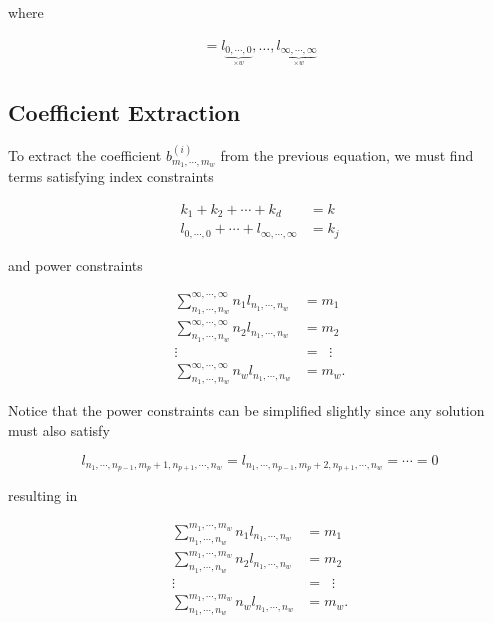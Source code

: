 where

\begin{align*}
    [l] = l_{\underbrace{0, \cdots, 0}_{\times w}}, \ldots, l_{\underbrace{\infty, \cdots, \infty}_{\times w}}
\end{align*}

\subsection{Coefficient Extraction}

To extract the coefficient $b^{(i)}_{m_1, \cdots, m_w}$ from the previous equation, we must find terms satisfying index constraints

\begin{align*}
    k_1 + k_2 + \cdots + k_d &= k \\
    l_{0, \cdots, 0} + \cdots + l_{\infty, \cdots, \infty} &= k_j
\end{align*}

and power constraints

\begin{align*}
    \sum_{n_1, \cdots, n_w}^{\infty, \cdots, \infty} n_1 l_{n_1, \cdots, n_w} &= m_1 \\
    \sum_{n_1, \cdots, n_w}^{\infty, \cdots, \infty} n_2 l_{n_1, \cdots, n_w} &= m_2 \\
    \vdots \qquad &= \;\; \vdots \\
    \sum_{n_1, \cdots, n_w}^{\infty, \cdots, \infty} n_w l_{n_1, \cdots, n_w} &= m_w.
\end{align*}

Notice that the power constraints can be simplified slightly since any solution must also satisfy

\begin{equation*}
    l_{n_1, \cdots, n_{p-1}, m_p + 1, n_{p+1}, \cdots, n_w} = l_{n_1, \cdots, n_{p-1}, m_p + 2, n_{p+1}, \cdots, n_w} = \cdots = 0
\end{equation*}

resulting in

\begin{align*}
    \sum_{n_1, \cdots, n_w}^{m_1, \cdots, m_w} n_1 l_{n_1, \cdots, n_w} &= m_1 \\
    \sum_{n_1, \cdots, n_w}^{m_1, \cdots, m_w} n_2 l_{n_1, \cdots, n_w} &= m_2 \\
    \vdots \qquad &= \;\; \vdots \\
    \sum_{n_1, \cdots, n_w}^{m_1, \cdots, m_w} n_w l_{n_1, \cdots, n_w} &= m_w.
\end{align*}

